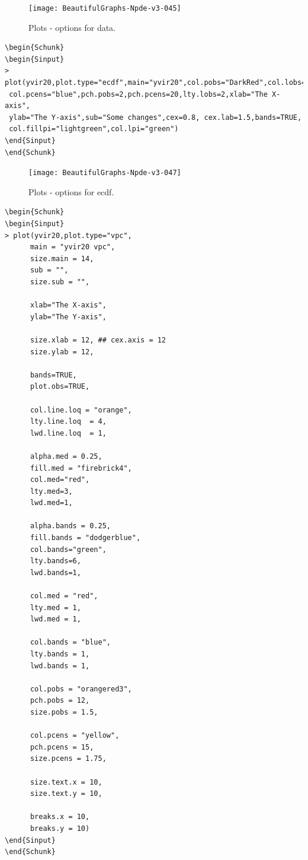 \documentclass{report}
\begin{document}
\begin{figure}[H]
\caption{Plots - options for data.}
\centering
\texttt{[image: BeautifulGraphs-Npde-v3-045]}
\end{figure}

\begin{lstlisting}[linerange=\\begin\{Sinput\}-\\end\{Sinput\}, includerangemarker=false]
\begin{Schunk}
\begin{Sinput}
> plot(yvir20,plot.type="ecdf",main="yvir20",col.pobs="DarkRed",col.lobs="DarkRed",
 col.pcens="blue",pch.pobs=2,pch.pcens=20,lty.lobs=2,xlab="The X-axis",
 ylab="The Y-axis",sub="Some changes",cex=0.8, cex.lab=1.5,bands=TRUE,
 col.fillpi="lightgreen",col.lpi="green")
\end{Sinput}
\end{Schunk}
\end{lstlisting}


\begin{figure}[H]
\caption{Plots - options for ecdf.}
\centering
\texttt{[image: BeautifulGraphs-Npde-v3-047]}
\end{figure}

\begin{lstlisting}[linerange=\\begin\{Sinput\}-\\end\{Sinput\}, includerangemarker=false]
\begin{Schunk}
\begin{Sinput}
> plot(yvir20,plot.type="vpc",
      main = "yvir20 vpc",
      size.main = 14,
      sub = "",
      size.sub = "",
 
      xlab="The X-axis",
      ylab="The Y-axis",
      
      size.xlab = 12, ## cex.axis = 12
      size.ylab = 12,
 
      bands=TRUE,
      plot.obs=TRUE,
 
      col.line.loq = "orange",
      lty.line.loq  = 4,
      lwd.line.loq  = 1,
 
      alpha.med = 0.25,
      fill.med = "firebrick4",
      col.med="red",
      lty.med=3,
      lwd.med=1,
 
      alpha.bands = 0.25,
      fill.bands = "dodgerblue",
      col.bands="green",
      lty.bands=6,
      lwd.bands=1,
 
      col.med = "red",
      lty.med = 1,
      lwd.med = 1,
 
      col.bands = "blue",
      lty.bands = 1,
      lwd.bands = 1,
 
      col.pobs = "orangered3",
      pch.pobs = 12,
      size.pobs = 1.5,
 
      col.pcens = "yellow",
      pch.pcens = 15,
      size.pcens = 1.75,
 
      size.text.x = 10,
      size.text.y = 10,
 
      breaks.x = 10,
      breaks.y = 10)
\end{Sinput}
\end{Schunk}
\end{lstlisting}
\end{document}
